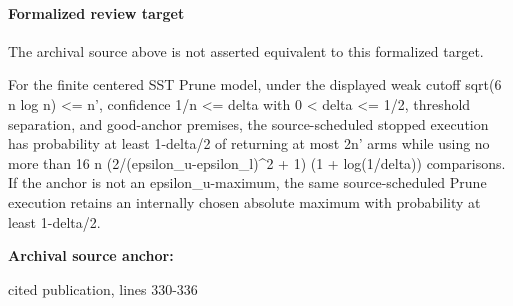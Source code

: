 \documentclass[10pt]{article}
\begin{document}
\paragraph{Formalized review target}
The archival source above is not asserted equivalent to this formalized target.
\begin{ReviewVerbatim}
For the finite centered SST Prune model, under the displayed weak cutoff sqrt(6 n log n) <= n', confidence 1/n <= delta with 0 < delta <= 1/2, threshold separation, and good-anchor premises, the source-scheduled stopped execution has probability at least 1-delta/2 of returning at most 2n' arms while using no more than 16 n (2/(epsilon_u-epsilon_l)^2 + 1) (1 + log(1/delta)) comparisons. If the anchor is not an epsilon_u-maximum, the same source-scheduled Prune execution retains an internally chosen absolute maximum with probability at least 1-delta/2.
\end{ReviewVerbatim}

\textbf{Archival source anchor:} {\footnotesize\raggedright cited publication, lines 330-\allowbreak{}336\par}
\end{document}
